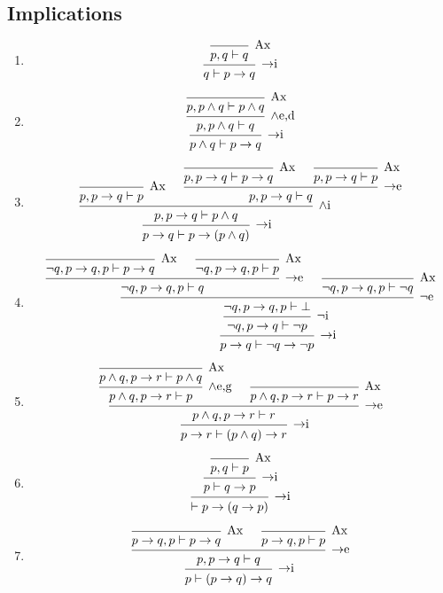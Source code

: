 \begin{multicols}{2}
	\section{Implications}
	\begin{enumerate}
		\item
			\[
				\begin{prooftree}
					\infer 0[Ax]{p,q \vdash q}
					\infer 1[$\to$i]{q \vdash p \to q}
				\end{prooftree}
			\]
		\item
			\[
				\begin{prooftree}
					\infer 0[Ax]{p, p\land q\vdash p\land q}
					\infer 1[$\land$e,d]{p, p \land q \vdash q}
					\infer 1[$\to$i]{p \land q \vdash p \to q}
				\end{prooftree}
			\]
		\item 
			\[
				\begin{prooftree}
					\infer 0[Ax]{p, p\to q \vdash p}
					\infer 0[Ax]{p, p\to q \vdash p \to q}
					\infer 0[Ax]{p, p\to q \vdash p}
					\infer 2[$\to$e]{p, p \to q \vdash q}
					\infer 2[$\land$i]{p, p \to q \vdash p \land q}
					\infer 1[$\to$i]{p \to q \vdash p\to (p \land q)}
				\end{prooftree}
			\]
		\item
			\[
				\begin{prooftree}
					\infer 0[Ax]{\lnot q, p\to q, p \vdash p \to q}
					\infer 0[Ax]{\lnot q, p\to q, p \vdash p}
					\infer 2[$\to$e]{\lnot q, p\to q, p \vdash q}
					\infer 0[Ax]{\lnot q, p\to q, p \vdash \lnot q}
					\infer 2[$\lnot$e]{\lnot q, p\to q, p \vdash \bot}
					\infer 1[$\lnot$i]{\lnot q, p\to q \vdash\lnot p}
					\infer 1[$\to$i]{p \to q \vdash \lnot q \to \lnot p}
				\end{prooftree}
			\]
		\item 
			\[
				\begin{prooftree}
					\infer 0[Ax]{p \land q, p\to r \vdash p \land q}
					\infer 1[$\land$e,g]{p \land q, p\to r \vdash p}
					\infer 0[Ax]{p \land q, p\to r \vdash p \to r}
					\infer 2[$\to$e]{p \land q, p \to r \vdash r}
					\infer 1[$\to$i]{p \to r \vdash (p \land q) \to r}
				\end{prooftree}
			\] 
		\item
			\[
				\begin{prooftree}
					\infer 0[Ax]{p,q\vdash p}
					\infer 1[$\to$i]{p \vdash q \to p}
					\infer 1[$\to$i]{\vdash p \to (q \to p)}
				\end{prooftree}
			\]
		\item
			\[
				\begin{prooftree}
					\infer 0[Ax]{p \to q, p \vdash p\to q}
					\infer 0[Ax]{p\to q,p \vdash p}
					\infer 2[$\to$e]{p, p\to q \vdash q}
					\infer 1[$\to$i]{p \vdash (p \to q) \to q}
				\end{prooftree}
			\] 
	\end{enumerate}
\end{multicols}
